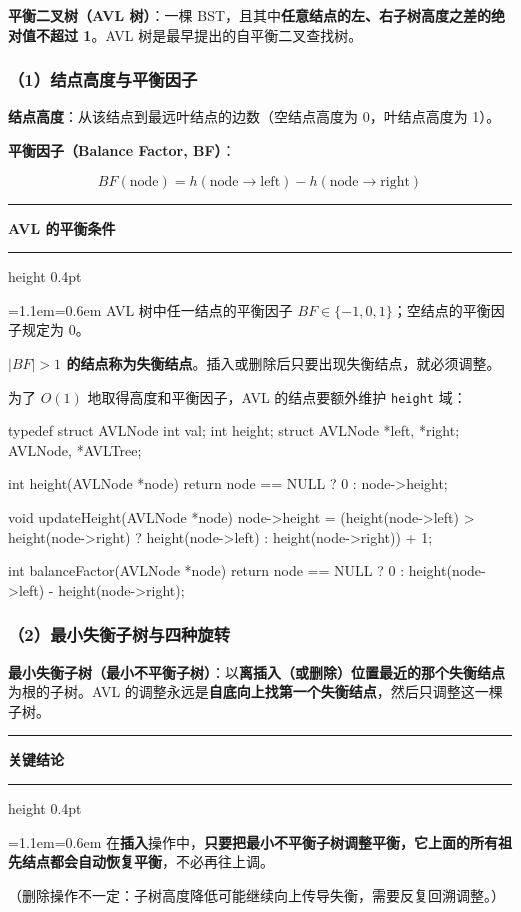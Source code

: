 \documentclass[11pt,openany,UTF8]{ctexbook}
\newcommand{\callouthead}[2]{%
  \par\addvspace{7pt}\noindent
  {\color{#1}\rule[-0.15em]{3pt}{1.05em}}\hspace{0.5em}%
  {\bfseries\color{#1}#2}\par\nobreak\vspace{-0.35em}%
  {\color{rulesep}\hrule height 0.4pt}\nobreak\vspace{0.45em}%
  \begingroup\small\setlength{\parindent}{0pt}%
  \leftskip=1.1em\rightskip=0.6em\noindent\ignorespaces}
\newcommand{\calloutend}{\par\endgroup\addvspace{7pt}}
\newenvironment{callkey}[1]{\callouthead{keybar}{#1}}{\calloutend}
\begin{document}
\textbf{平衡二叉树（AVL 树）}：一棵 BST，且其中\textbf{任意结点的左、右子树高度之差的绝对值不超过 1}。AVL 树是最早提出的自平衡二叉查找树。

\subsubsection{（1）结点高度与平衡因子}

\textbf{结点高度}：从该结点到最远叶结点的边数（空结点高度为 0，叶结点高度为 1）。

\textbf{平衡因子（Balance Factor, BF）}：

\[BF(\text{node})=h(\text{node}\rightarrow\text{left})-h(\text{node}\rightarrow\text{right})\]

\begin{callkey}{AVL 的平衡条件}
AVL 树中任一结点的平衡因子 $BF\in\{-1,0,1\}$；空结点的平衡因子规定为 0。

\textbf{$|BF|>1$ 的结点称为失衡结点}。插入或删除后只要出现失衡结点，就必须调整。

\end{callkey}

为了 $O(1)$ 地取得高度和平衡因子，AVL 的结点要额外维护 \texttt{height} 域：

\begin{codebox}
typedef struct AVLNode {
    int val;
    int height;
    struct AVLNode *left, *right;
} AVLNode, *AVLTree;

int height(AVLNode *node) { return node == NULL ? 0 : node->height; }

void updateHeight(AVLNode *node) {
    node->height = (height(node->left) > height(node->right)
                    ? height(node->left) : height(node->right)) + 1;
}

int balanceFactor(AVLNode *node) {
    return node == NULL ? 0 : height(node->left) - height(node->right);
}
\end{codebox}

\subsubsection{（2）最小失衡子树与四种旋转}

\textbf{最小失衡子树（最小不平衡子树）}：以\textbf{离插入（或删除）位置最近的那个失衡结点}为根的子树。AVL 的调整永远是\textbf{自底向上找第一个失衡结点}，然后只调整这一棵子树。

\begin{callkey}{关键结论}
在\textbf{插入}操作中，\textbf{只要把最小不平衡子树调整平衡，它上面的所有祖先结点都会自动恢复平衡}，不必再往上调。

（删除操作不一定：子树高度降低可能继续向上传导失衡，需要反复回溯调整。）

\end{callkey}
\end{document}
